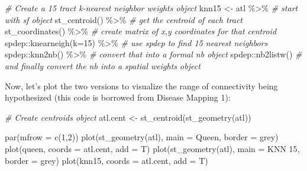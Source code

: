 \documentclass[
]{book}
\newenvironment{Shaded}{\begin{snugshade}}{\end{snugshade}}
\newcommand{\AttributeTok}[1]{\textcolor[rgb]{0.77,0.63,0.00}{#1}}
\newcommand{\CommentTok}[1]{\textcolor[rgb]{0.56,0.35,0.01}{\textit{#1}}}
\newcommand{\DecValTok}[1]{\textcolor[rgb]{0.00,0.00,0.81}{#1}}
\newcommand{\FunctionTok}[1]{\textcolor[rgb]{0.00,0.00,0.00}{#1}}
\newcommand{\NormalTok}[1]{#1}
\newcommand{\OtherTok}[1]{\textcolor[rgb]{0.56,0.35,0.01}{#1}}
\newcommand{\SpecialCharTok}[1]{\textcolor[rgb]{0.00,0.00,0.00}{#1}}
\newcommand{\StringTok}[1]{\textcolor[rgb]{0.31,0.60,0.02}{#1}}
\begin{document}
\begin{Shaded}
\begin{Highlighting}[]
\CommentTok{\# Create a 15 tract k{-}nearest neighbor weights object}
\NormalTok{knn15 }\OtherTok{\textless{}{-}}\NormalTok{ atl }\SpecialCharTok{\%\textgreater{}\%}               \CommentTok{\# start with sf object}
  \FunctionTok{st\_centroid}\NormalTok{() }\SpecialCharTok{\%\textgreater{}\%}            \CommentTok{\# get the centroid of each tract}
  \FunctionTok{st\_coordinates}\NormalTok{() }\SpecialCharTok{\%\textgreater{}\%}         \CommentTok{\# create matrix of x,y coordinates for that centroid}
\NormalTok{  spdep}\SpecialCharTok{::}\FunctionTok{knearneigh}\NormalTok{(}\AttributeTok{k=}\DecValTok{15}\NormalTok{) }\SpecialCharTok{\%\textgreater{}\%}  \CommentTok{\# use spdep to find 15 nearest neighbors}
\NormalTok{  spdep}\SpecialCharTok{::}\FunctionTok{knn2nb}\NormalTok{() }\SpecialCharTok{\%\textgreater{}\%}          \CommentTok{\# convert that into a formal nb object}
\NormalTok{  spdep}\SpecialCharTok{::}\FunctionTok{nb2listw}\NormalTok{()            }\CommentTok{\# and finally convert the nb into a spatial weights object}
\end{Highlighting}
\end{Shaded}

Now, let's plot the two versions to visualize the range of connectivity being hypothesized (this code is borrowed from Disease Mapping 1):

\begin{Shaded}
\begin{Highlighting}[]
\CommentTok{\# Create centroids object}
\NormalTok{atl.cent }\OtherTok{\textless{}{-}} \FunctionTok{st\_centroid}\NormalTok{(}\FunctionTok{st\_geometry}\NormalTok{(atl))}

\FunctionTok{par}\NormalTok{(}\AttributeTok{mfrow =} \FunctionTok{c}\NormalTok{(}\DecValTok{1}\NormalTok{,}\DecValTok{2}\NormalTok{))}
\FunctionTok{plot}\NormalTok{(}\FunctionTok{st\_geometry}\NormalTok{(atl), }\AttributeTok{main =} \StringTok{\textquotesingle{}Queen\textquotesingle{}}\NormalTok{, }\AttributeTok{border =} \StringTok{\textquotesingle{}grey\textquotesingle{}}\NormalTok{)}
\FunctionTok{plot}\NormalTok{(queen, }\AttributeTok{coords =}\NormalTok{ atl.cent, }\AttributeTok{add =}\NormalTok{ T)}
\FunctionTok{plot}\NormalTok{(}\FunctionTok{st\_geometry}\NormalTok{(atl), }\AttributeTok{main =} \StringTok{\textquotesingle{}KNN 15\textquotesingle{}}\NormalTok{, }\AttributeTok{border =} \StringTok{\textquotesingle{}grey\textquotesingle{}}\NormalTok{)}
\FunctionTok{plot}\NormalTok{(knn15, }\AttributeTok{coords =}\NormalTok{ atl.cent, }\AttributeTok{add =}\NormalTok{ T)}
\end{Highlighting}
\end{Shaded}
\end{document}
